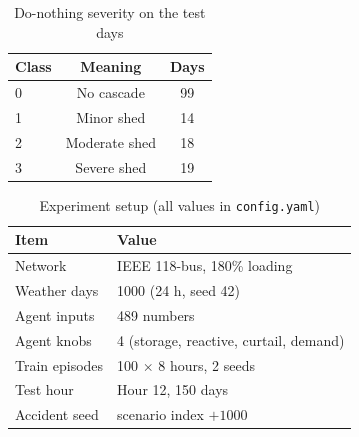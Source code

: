 \begin{table}[t]
\centering
\caption{Do-nothing severity on the test days}
\label{tab:severity}
\begin{tabular}{lcc}
\toprule
Class & Meaning & Days \\
\midrule
0 & No cascade & 99 \\
1 & Minor shed & 14 \\
2 & Moderate shed & 18 \\
3 & Severe shed & 19 \\
\bottomrule
\end{tabular}
\end{table}

\begin{table}[t]
\centering
\caption{Experiment setup (all values in \texttt{config.yaml})}
\label{tab:setup}
\begin{tabular}{ll}
\toprule
Item & Value \\
\midrule
Network & IEEE 118-bus, 180\% loading \\
Weather days & 1000 (24 h, seed 42) \\
Agent inputs & 489 numbers \\
Agent knobs & 4 (storage, reactive, curtail, demand) \\
Train episodes & 100 $\times$ 8 hours, 2 seeds \\
Test hour & Hour 12, 150 days \\
Accident seed & scenario index $+ 1000$ \\
\bottomrule
\end{tabular}
\end{table}
